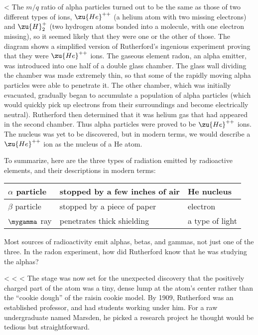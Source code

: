 <%
        The $m/q$ ratio of alpha particles turned out to be the same
        as those of two different types of ions, $\zu{He}^{++}$ (a helium atom
        with two missing electrons) and $\zu{H}_2^+$ (two hydrogen atoms
        bonded into a molecule, with one electron missing), so it
        seemed likely that they were one or the other of those. The
        diagram shows a simplified version of Rutherford's ingenious
        experiment proving that they were $\zu{He}^{++}$ ions. The gaseous
        element radon, an alpha emitter, was introduced into one
        half of a double glass chamber. The glass wall dividing the
        chamber was made extremely thin, so that some of the rapidly
        moving alpha particles were able to penetrate it. The other
        chamber, which was initially evacuated, gradually began to
        accumulate a population of alpha particles (which would
        quickly pick up electrons from their surroundings and become
        electrically neutral). Rutherford then determined that it
        was helium gas that had appeared in the second chamber. Thus
        alpha particles were proved to be $\zu{He}^{++}$ ions. The nucleus was
        yet to be discovered, but in modern terms, we would describe
        a $\zu{He}^{++}$ ion as the nucleus of a He atom.         

        To summarize, here are the three types of radiation emitted
        by radioactive elements, and their descriptions in modern terms:

        \begin{tabular}{|l|l|l|}
                \hline
                $\alpha$ particle        &stopped by a few inches of air        &He nucleus\\
                \hline
                $\beta$ particle        &stopped by a piece of paper                &electron\\
                \hline
                $\mygamma$ ray        &penetrates thick shielding                &a type of light\\
                \hline
        \end{tabular}


\startdq
\begin{dq}
        Most sources of radioactivity emit alphas, betas, and
        gammas, not just one of the three. In the radon experiment,
        how did Rutherford know that he was studying the alphas?
\end{dq}
    <%
  <%
  <%
        The stage was now set for the unexpected discovery that the
        positively charged part of the atom was a tiny, dense lump
        at the atom's center rather than the ``cookie dough'' of the
        raisin cookie model. By 1909, Rutherford was an established
        professor, and had students working under him. For a raw
        undergraduate named Marsden, he picked a research project he
        thought would be tedious but straightforward.

